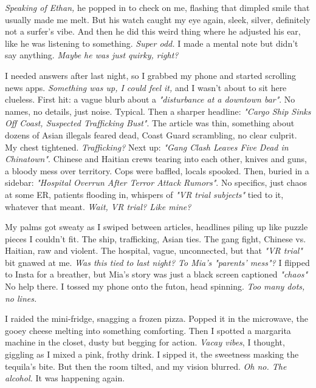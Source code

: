\documentclass[12pt,oneside]{book}
\begin{document}
\textit{Speaking of Ethan,} he popped in to check on me, flashing that dimpled smile that usually made me melt. But his watch caught my eye again, sleek, silver, definitely not a surfer’s vibe. And then he did this weird thing where he adjusted his ear, like he was listening to something. \textit{Super odd.} I made a mental note but didn’t say anything. \textit{Maybe he was just quirky, right?}

I needed answers after last night, so I grabbed my phone and started scrolling news apps. \textit{Something was up, I could feel it,} and I wasn’t about to sit here clueless. First hit: a vague blurb about a \textit{"disturbance at a downtown bar"}. No names, no details, just noise. Typical. Then a sharper headline: \textit{"Cargo Ship Sinks Off Coast, Suspected Trafficking Bust"}. The article was thin, something about dozens of Asian illegals feared dead, Coast Guard scrambling, no clear culprit. My chest tightened. \textit{Trafficking?} Next up: \textit{"Gang Clash Leaves Five Dead in Chinatown"}. Chinese and Haitian crews tearing into each other, knives and guns, a bloody mess over territory. Cops were baffled, locals spooked. Then, buried in a sidebar: \textit{"Hospital Overrun After Terror Attack Rumors"}. No specifics, just chaos at some ER, patients flooding in, whispers of \textit{"VR trial subjects"} tied to it, whatever that meant. \textit{Wait, VR trial? Like mine?}

My palms got sweaty as I swiped between articles, headlines piling up like puzzle pieces I couldn’t fit. The ship, trafficking, Asian ties. The gang fight, Chinese vs. Haitian, raw and violent. The hospital, vague, unconnected, but that \textit{"VR trial"} bit gnawed at me. \textit{Was this tied to last night? To Mia’s "parents’ mess"?} I flipped to Insta for a breather, but Mia’s story was just a black screen captioned \textit{"chaos"} No help there. I tossed my phone onto the futon, head spinning. \textit{Too many dots, no lines.}

I raided the mini-fridge, snagging a frozen pizza. Popped it in the microwave, the gooey cheese melting into something comforting. Then I spotted a margarita machine in the closet, dusty but begging for action. \textit{Vacay vibes}, I thought, giggling as I mixed a pink, frothy drink. I sipped it, the sweetness masking the tequila’s bite. But then the room tilted, and my vision blurred. \textit{Oh no. The alcohol.} It was happening again.
\end{document}
